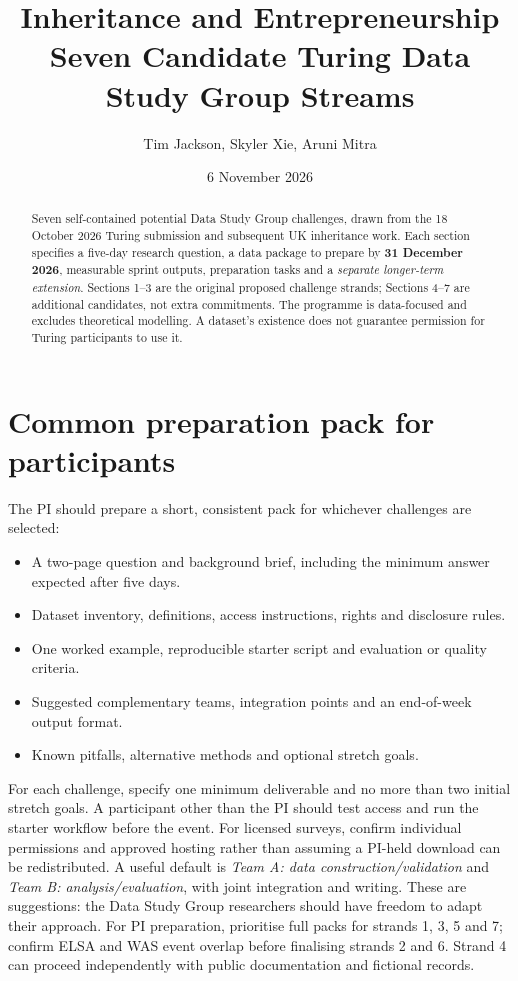 \documentclass[11pt,a4paper]{article}
\title{Inheritance and Entrepreneurship\\[0.4em]\large Seven Candidate Turing Data Study Group Streams}
\author{Tim Jackson, Skyler Xie, Aruni Mitra}
\date{6 November 2026}
\begin{document}
\maketitle

\begin{abstract}
Seven self-contained potential Data Study Group challenges, drawn from the 18 October 2026 Turing submission and subsequent UK inheritance work. Each section specifies a five-day research question, a data package to prepare by \textbf{31 December 2026}, measurable sprint outputs, preparation tasks and a \emph{separate longer-term extension}. Sections 1--3 are the original proposed challenge strands; Sections 4--7 are additional candidates, not extra commitments. The programme is data-focused and excludes theoretical modelling. A dataset's existence does not guarantee permission for Turing participants to use it.
\end{abstract}

\section*{Common preparation pack for participants}
The PI should prepare a short, consistent pack for whichever challenges are selected:
\begin{itemize}[nosep]
\item A two-page question and background brief, including the minimum answer expected after five days.
\item Dataset inventory, definitions, access instructions, rights and disclosure rules.
\item One worked example, reproducible starter script and evaluation or quality criteria.
\item Suggested complementary teams, integration points and an end-of-week output format.
\item Known pitfalls, alternative methods and optional stretch goals.
\end{itemize}
For each challenge, specify one minimum deliverable and no more than two initial stretch goals. A participant other than the PI should test access and run the starter workflow before the event. For licensed surveys, confirm individual permissions and approved hosting rather than assuming a PI-held download can be redistributed. A useful default is \emph{Team A: data construction/validation} and \emph{Team B: analysis/evaluation}, with joint integration and writing. These are suggestions: the Data Study Group researchers should have freedom to adapt their approach. For PI preparation, prioritise full packs for strands 1, 3, 5 and 7; confirm ELSA and WAS event overlap before finalising strands 2 and 6. Strand 4 can proceed independently with public documentation and fictional records.

\tableofcontents
\clearpage


\clearpage

\clearpage

\clearpage

\clearpage

\clearpage

\clearpage

\end{document}
